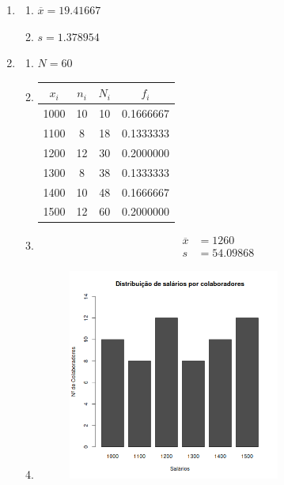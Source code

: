 \documentclass[11pt,a4paper]{article}
\begin{document}
\begin{enumerate}[label=\arabic{section}.\arabic*]
	\item {}
		\begin{enumerate}[label=\alph*)]
		\item $\overline{x} = 19.41667$\hfill
			
		\item $s = 1.378954$\hfill
			
		\end{enumerate}
	\item {}\hfill
		\begin{enumerate}[label=\alph*)]
		\item $N = 60$\hfill
			
		\item \hfill
			\begin{table}[h!]
				\centering
				\begin{tabular}{|c|c|c|c|}
					\hline
					$x_i$&$n_i$&$N_i$&$f_i$ \\
					\hline
					1000&10&10&0.1666667\\
					\hline
					1100& 8&18&0.1333333\\
					\hline
					1200&12&30&0.2000000\\
					\hline
					1300& 8&38&0.1333333\\
					\hline
					1400&10&48&0.1666667\\
					\hline
					1500&12&60&0.2000000\\
					\hline
				\end{tabular}
			\end{table}
			
		\item \hfill
			\begin{align*}
				\overline{x} &= 1260 \\
				s &= 54.09868
			\end{align*}
			
		\clearpage
		\item \hfill
			\begin{figure}[h!]
				\centering
				\includegraphics[width=0.7\textwidth]{./recursos/ex4_2d.png}

\end{figure}
\end{enumerate}
\end{enumerate}
\end{document}
